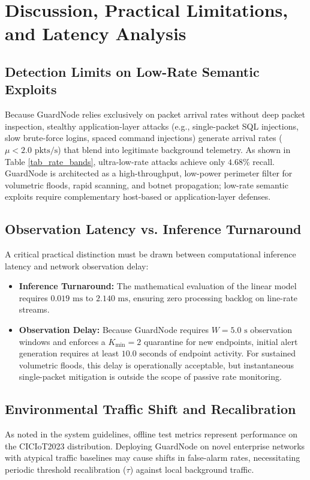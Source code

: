 \documentclass[conference]{IEEEtran}
\begin{document}
\section{Discussion, Practical Limitations, and Latency Analysis}

\subsection{Detection Limits on Low-Rate Semantic Exploits}
Because GuardNode relies exclusively on packet arrival rates without deep packet inspection, stealthy application-layer attacks (e.g., single-packet SQL injections, slow brute-force logins, spaced command injections) generate arrival rates ($\mu < 2.0\text{ pkts/s}$) that blend into legitimate background telemetry. As shown in Table \ref{tab_rate_bands}, ultra-low-rate attacks achieve only $4.68\%$ recall. GuardNode is architected as a high-throughput, low-power perimeter filter for volumetric floods, rapid scanning, and botnet propagation; low-rate semantic exploits require complementary host-based or application-layer defenses.

\subsection{Observation Latency vs. Inference Turnaround}
A critical practical distinction must be drawn between computational inference latency and network observation delay:
\begin{itemize}
    \item \textbf{Inference Turnaround:} The mathematical evaluation of the linear model requires $0.019\text{ ms}$ to $2.140\text{ ms}$, ensuring zero processing backlog on line-rate streams.
    \item \textbf{Observation Delay:} Because GuardNode requires $W = 5.0\text{ s}$ observation windows and enforces a $K_{\min} = 2$ quarantine for new endpoints, initial alert generation requires at least $10.0\text{ seconds}$ of endpoint activity. For sustained volumetric floods, this delay is operationally acceptable, but instantaneous single-packet mitigation is outside the scope of passive rate monitoring.
\end{itemize}

\subsection{Environmental Traffic Shift and Recalibration}
As noted in the system guidelines, offline test metrics represent performance on the CICIoT2023 distribution. Deploying GuardNode on novel enterprise networks with atypical traffic baselines may cause shifts in false-alarm rates, necessitating periodic threshold recalibration ($\tau$) against local background traffic.
\end{document}
